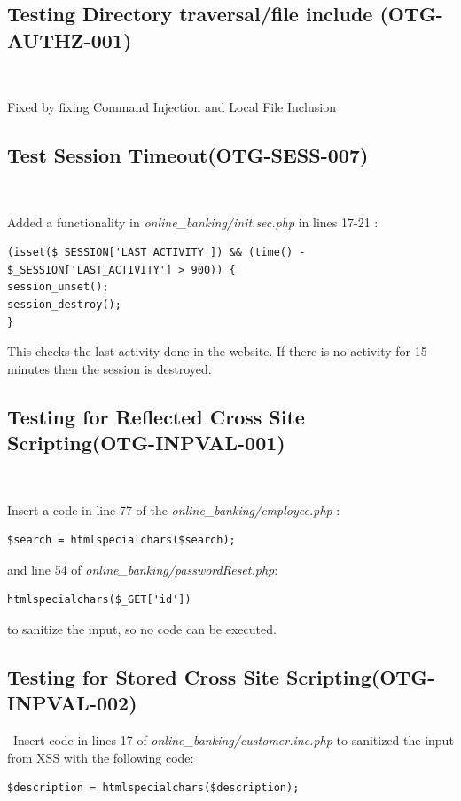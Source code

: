 \documentclass[headsepline,footsepline,footinclude=false,oneside,fontsize=11pt,paper=a4,listof=totoc,bibliography=totoc]{scrbook} %
\begin{document}
\subsection{Testing Directory traversal/file include (OTG-AUTHZ-001)}\

Fixed by fixing Command Injection and Local File Inclusion

\pagebreak
\subsection{Test Session Timeout(OTG-SESS-007)}\

Added a functionality in \textit{online\_banking/init.sec.php} in lines 17-21 :  


\begin{lstlisting}
(isset($_SESSION['LAST_ACTIVITY']) && (time() - $_SESSION['LAST_ACTIVITY'] > 900)) { 
session_unset();    
session_destroy();   
}
\end{lstlisting} 


This checks the last activity done in the website. If there is no activity for 15 minutes then the session is destroyed.\\



\subsection{Testing for Reflected Cross Site Scripting(OTG-INPVAL-001)} \

Insert a code in line 77 of the\textit{ online\_banking/employee.php} : 
\begin{lstlisting}
$search = htmlspecialchars($search);  

\end{lstlisting}
and line 54 of \textit{online\_banking/passwordReset.php}:  
\begin{lstlisting} 
htmlspecialchars($_GET['id']) 
\end{lstlisting}
to sanitize the input, so no code can be executed.
\pagebreak
\subsection{Testing for Stored Cross Site Scripting(OTG-INPVAL-002)}\
Insert code in lines 17 of \textit{online\_banking/customer.inc.php} to sanitized the input from XSS with the following code:   

\begin{lstlisting} 
$description = htmlspecialchars($description);
\end{lstlisting}
\end{document}
